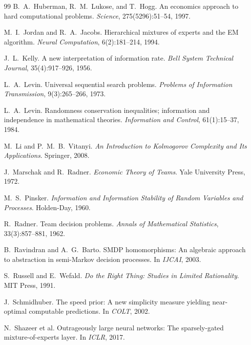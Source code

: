 \documentclass[10pt]{article}
\theoremstyle{paperplain}
\theoremstyle{paperdefinition}
\theoremstyle{paperremark}
\begin{document}
\begin{thebibliography}{99}
B.~A.~Huberman, R.~M.~Lukose, and T.~Hogg.
\newblock An economics approach to hard computational problems.
\newblock \emph{Science}, 275(5296):51--54, 1997.

M.~I.~Jordan and R.~A.~Jacobs.
\newblock Hierarchical mixtures of experts and the EM algorithm.
\newblock \emph{Neural Computation}, 6(2):181--214, 1994.

J.~L.~Kelly.
\newblock A new interpretation of information rate.
\newblock \emph{Bell System Technical Journal}, 35(4):917--926, 1956.

L.~A.~Levin.
\newblock Universal sequential search problems.
\newblock \emph{Problems of Information Transmission}, 9(3):265--266, 1973.

L.~A.~Levin.
\newblock Randomness conservation inequalities; information and independence in mathematical theories.
\newblock \emph{Information and Control}, 61(1):15--37, 1984.

M.~Li and P.~M.~B.~Vitanyi.
\newblock \emph{An Introduction to Kolmogorov Complexity and Its Applications}.
\newblock Springer, 2008.

J.~Marschak and R.~Radner.
\newblock \emph{Economic Theory of Teams}.
\newblock Yale University Press, 1972.

M.~S.~Pinsker.
\newblock \emph{Information and Information Stability of Random Variables and Processes}.
\newblock Holden-Day, 1960.

R.~Radner.
\newblock Team decision problems.
\newblock \emph{Annals of Mathematical Statistics}, 33(3):857--881, 1962.

B.~Ravindran and A.~G.~Barto.
\newblock SMDP homomorphisms: An algebraic approach to abstraction in semi-Markov decision processes.
\newblock In \emph{IJCAI}, 2003.

S.~Russell and E.~Wefald.
\newblock \emph{Do the Right Thing: Studies in Limited Rationality}.
\newblock MIT Press, 1991.

J.~Schmidhuber.
\newblock The speed prior: A new simplicity measure yielding near-optimal computable predictions.
\newblock In \emph{COLT}, 2002.

N.~Shazeer et al.
\newblock Outrageously large neural networks: The sparsely-gated mixture-of-experts layer.
\newblock In \emph{ICLR}, 2017.


\end{thebibliography}
\end{document}
